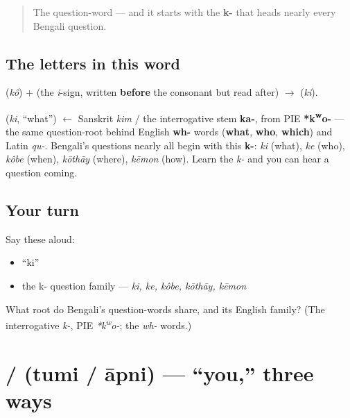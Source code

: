 \begin{quote}
The question-word — and it starts with the \textbf{k-} that heads nearly every Bengali question.
\end{quote}

\subsection*{The letters in this word}
\textbf{} (\emph{kô}) + \textbf{} (the \emph{i}-sign, written \textbf{before} the consonant but read after) $\to$ \textbf{} (\emph{ki}).

\begin{cousinweb}
\textbf{} (\emph{ki}, \textquotedblleft{}what\textquotedblright{}) $\leftarrow$ Sanskrit \emph{kim} / the interrogative stem \textbf{ka-}, from PIE \textbf{*k\textsuperscript{w}o-} — the same question-root behind English \textbf{wh-} words (\textbf{what}, \textbf{who}, \textbf{which}) and Latin \emph{qu-}. Bengali's questions nearly all begin with this \textbf{k-}: \emph{ki} (what), \emph{ke} (who), \emph{kôbe} (when), \emph{kōthāy} (where), \emph{kēmon} (how). Learn the \emph{k-} and you can hear a question coming.
\end{cousinweb}

\subsection*{Your turn}
Say these aloud:

\begin{itemize}
\raggedright
  \item \textquotedblleft{}ki\textquotedblright{}
  \item the k- question family — \emph{ki, ke, kôbe, kōthāy, kēmon}
\end{itemize}

\begin{tcolorbox}[breakable,colback=teal!4,colframe=teal!35!black,title={Before you move on}]
What root do Bengali's question-words share, and its English family? (The interrogative \emph{k-}, PIE \emph{*k\textsuperscript{w}o-}; the \emph{wh-} words.)
\end{tcolorbox}
\section[\bn{তুমি} / \bn{আপনি}]{ /  (tumi / āpni) — \textquotedblleft{}you,\textquotedblright{} three ways}

